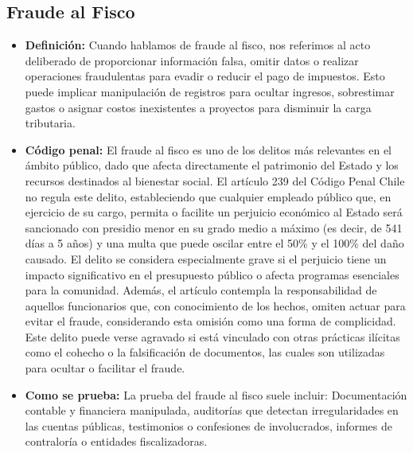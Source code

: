 \documentclass[letter,12pt]{article}
\begin{document}
	\subsection{Fraude al Fisco}
	\begin{itemize}
		\item \textbf{Definición: }Cuando hablamos de fraude al fisco, nos referimos al acto deliberado de proporcionar información falsa, omitir datos o realizar operaciones fraudulentas para evadir o reducir el pago de impuestos. Esto puede implicar manipulación de registros para ocultar ingresos, sobrestimar gastos o asignar costos inexistentes a proyectos para disminuir la carga tributaria.\\
		
		\item \textbf{Código penal: }El fraude al fisco es uno de los delitos más relevantes en el ámbito público, dado que afecta directamente el patrimonio del Estado y los recursos destinados al bienestar social. El artículo 239 del Código Penal Chile no regula este delito, estableciendo que cualquier empleado público que, en ejercicio de su cargo, permita o facilite un perjuicio económico al Estado será sancionado con presidio menor en su grado medio a máximo (es decir, de 541 días a 5 años) y una multa que puede oscilar entre el 50\% y el 100\% del daño causado. El delito se considera especialmente grave si el perjuicio tiene un impacto significativo en el presupuesto público o afecta programas esenciales para la comunidad. Además, el artículo contempla la responsabilidad de aquellos funcionarios que, con conocimiento de los hechos, omiten actuar para evitar el fraude, considerando esta omisión como una forma de complicidad. Este delito puede verse agravado si está vinculado con otras prácticas ilícitas como el cohecho o la falsificación de documentos, las cuales son utilizadas para ocultar o facilitar el fraude.\\
		
		\item \textbf{Como se prueba: }La prueba del fraude al fisco suele incluir: Documentación contable y financiera manipulada, auditorías que detectan irregularidades en las cuentas públicas, testimonios o confesiones de involucrados, informes de contraloría o entidades fiscalizadoras.\\
		\newpage
		

\end{itemize}
\end{document}
